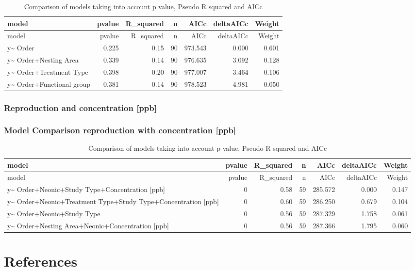 \documentclass[]{elsarticle} %
\begin{document}
\begin{longtable}[c]{@{}lrrrrrr@{}}
\caption{Comparison of models taking into account p value, Pseudo R
squared and AICc}\tabularnewline
\toprule
model & pvalue & R\_squared & n & AICc & deltaAICc &
Weight\tabularnewline
\midrule
\endfirsthead
\toprule
model & pvalue & R\_squared & n & AICc & deltaAICc &
Weight\tabularnewline
\midrule
\endhead
y\textasciitilde{} Order & 0.225 & 0.15 & 90 & 973.543 & 0.000 &
0.601\tabularnewline
y\textasciitilde{} Order+Nesting Area & 0.339 & 0.14 & 90 & 976.635 &
3.092 & 0.128\tabularnewline
y\textasciitilde{} Order+Treatment Type & 0.398 & 0.20 & 90 & 977.007 &
3.464 & 0.106\tabularnewline
y\textasciitilde{} Order+Functional group & 0.381 & 0.14 & 90 & 978.523
& 4.981 & 0.050\tabularnewline
\bottomrule
\end{longtable}

\subsubsection{Reproduction and concentration
{[}ppb{]}}\label{reproduction-and-concentration-ppb}

\subsubsection{Model Comparison reproduction with concentration
{[}ppb{]}}\label{model-comparison-reproduction-with-concentration-ppb}

\begin{longtable}[c]{@{}lrrrrrr@{}}
\caption{Comparison of models taking into account p value, Pseudo R
squared and AICc}\tabularnewline
\toprule
model & pvalue & R\_squared & n & AICc & deltaAICc &
Weight\tabularnewline
\midrule
\endfirsthead
\toprule
model & pvalue & R\_squared & n & AICc & deltaAICc &
Weight\tabularnewline
\midrule
\endhead
y\textasciitilde{} Order+Neonic+Study Type+Concentration {[}ppb{]} & 0 &
0.58 & 59 & 285.572 & 0.000 & 0.147\tabularnewline
y\textasciitilde{} Order+Neonic+Treatment Type+Study Type+Concentration
{[}ppb{]} & 0 & 0.60 & 59 & 286.250 & 0.679 & 0.104\tabularnewline
y\textasciitilde{} Order+Neonic+Study Type & 0 & 0.56 & 59 & 287.329 &
1.758 & 0.061\tabularnewline
y\textasciitilde{} Order+Nesting Area+Neonic+Concentration {[}ppb{]} & 0
& 0.56 & 59 & 287.366 & 1.795 & 0.060\tabularnewline
\bottomrule
\end{longtable}

\section*{References}\label{references}
\end{document}
